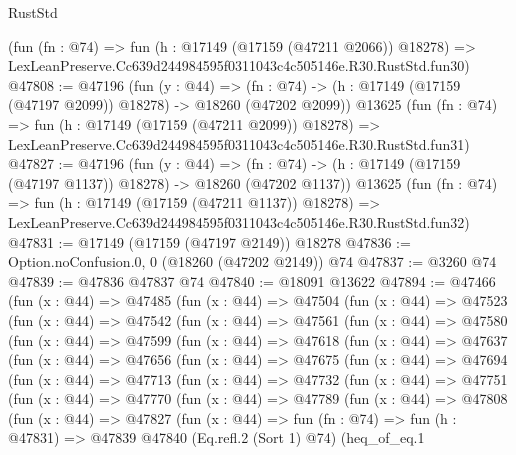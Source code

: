 \begin{lexlean}{RustStd}
\begin{coremodule}
    (fun (fn : @74) =>
    fun (h : @17149 (@17159 (@47211 @2066)) @18278) =>
    LexLeanPreserve.Cc639d244984595f0311043c4c505146e.R30.RustStd.fun30)
@47808 := @47196
    (fun (y : @44) =>
    (fn : @74) -> (h : @17149 (@17159 (@47197 @2099)) @18278) -> @18260 (@47202 @2099))
    @13625
    (fun (fn : @74) =>
    fun (h : @17149 (@17159 (@47211 @2099)) @18278) =>
    LexLeanPreserve.Cc639d244984595f0311043c4c505146e.R30.RustStd.fun31)
@47827 := @47196
    (fun (y : @44) =>
    (fn : @74) -> (h : @17149 (@17159 (@47197 @1137)) @18278) -> @18260 (@47202 @1137))
    @13625
    (fun (fn : @74) =>
    fun (h : @17149 (@17159 (@47211 @1137)) @18278) =>
    LexLeanPreserve.Cc639d244984595f0311043c4c505146e.R30.RustStd.fun32)
@47831 := @17149 (@17159 (@47197 @2149)) @18278
@47836 := Option.noConfusion.{0, 0} (@18260 (@47202 @2149)) @74
@47837 := @3260 @74
@47839 := @47836 @47837 @74
@47840 := @18091 @13622
@47894 := @47466
    (fun (x : @44) =>
    @47485
      (fun (x : @44) =>
      @47504
        (fun (x : @44) =>
        @47523
          (fun (x : @44) =>
          @47542
            (fun (x : @44) =>
            @47561
              (fun (x : @44) =>
              @47580
                (fun (x : @44) =>
                @47599
                  (fun (x : @44) =>
                  @47618
                    (fun (x : @44) =>
                    @47637
                      (fun (x : @44) =>
                      @47656
                        (fun (x : @44) =>
                        @47675
                          (fun (x : @44) =>
                          @47694
                            (fun (x : @44) =>
                            @47713
                              (fun (x : @44) =>
                              @47732
                                (fun (x : @44) =>
                                @47751
                                  (fun (x : @44) =>
                                  @47770
                                    (fun (x : @44) =>
                                    @47789
                                      (fun (x : @44) =>
                                      @47808
                                        (fun (x : @44) =>
                                        @47827
                                          (fun (x : @44) =>
                                          fun (fn : @74) =>
                                          fun (h : @47831) =>
                                          @47839
                                            @47840
                                            (Eq.refl.{2} (Sort 1) @74)
                                            (heq_of_eq.{1}

\end{coremodule}
\end{lexlean}
